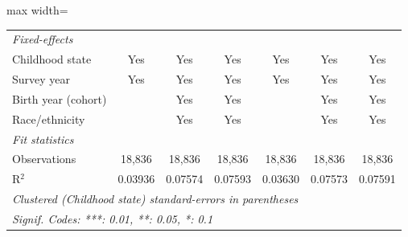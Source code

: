 \begin{adjustbox}{max width=\linewidth}
\begin{tabular}{lcccccc}
      \midrule
      \emph{Fixed-effects}\\
      Childhood state                                    & Yes           & Yes           & Yes         & Yes           & Yes           & Yes\\  
      Survey year                                        & Yes           & Yes           & Yes         & Yes           & Yes           & Yes\\  
      Birth year (cohort)                                &               & Yes           & Yes         &               & Yes           & Yes\\  
      Race/ethnicity                                     &               & Yes           & Yes         &               & Yes           & Yes\\  
      \midrule
      \emph{Fit statistics}\\
      Observations                                       & 18,836        & 18,836        & 18,836      & 18,836        & 18,836        & 18,836\\  
      R$^2$                                              & 0.03936       & 0.07574       & 0.07593     & 0.03630       & 0.07573       & 0.07591\\  
      \midrule \midrule
      \multicolumn{7}{l}{\emph{Clustered (Childhood state) standard-errors in parentheses}}\\
      \multicolumn{7}{l}{\emph{Signif. Codes: ***: 0.01, **: 0.05, *: 0.1}}\\
   \end{tabular}
      \end{adjustbox}
\vspace{3pt}\par{}
